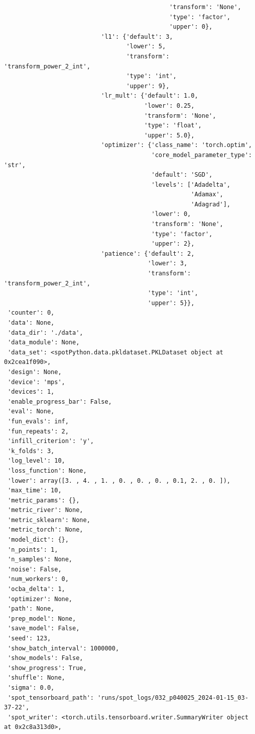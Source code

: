 \documentclass[
  letterpaper,
  DIV=11,
  numbers=noendperiod]{scrreprt}
\begin{document}
\begin{verbatim}
                                              'transform': 'None',
                                              'type': 'factor',
                                              'upper': 0},
                           'l1': {'default': 3,
                                  'lower': 5,
                                  'transform': 'transform_power_2_int',
                                  'type': 'int',
                                  'upper': 9},
                           'lr_mult': {'default': 1.0,
                                       'lower': 0.25,
                                       'transform': 'None',
                                       'type': 'float',
                                       'upper': 5.0},
                           'optimizer': {'class_name': 'torch.optim',
                                         'core_model_parameter_type': 'str',
                                         'default': 'SGD',
                                         'levels': ['Adadelta',
                                                    'Adamax',
                                                    'Adagrad'],
                                         'lower': 0,
                                         'transform': 'None',
                                         'type': 'factor',
                                         'upper': 2},
                           'patience': {'default': 2,
                                        'lower': 3,
                                        'transform': 'transform_power_2_int',
                                        'type': 'int',
                                        'upper': 5}},
 'counter': 0,
 'data': None,
 'data_dir': './data',
 'data_module': None,
 'data_set': <spotPython.data.pkldataset.PKLDataset object at 0x2cea1f090>,
 'design': None,
 'device': 'mps',
 'devices': 1,
 'enable_progress_bar': False,
 'eval': None,
 'fun_evals': inf,
 'fun_repeats': 2,
 'infill_criterion': 'y',
 'k_folds': 3,
 'log_level': 10,
 'loss_function': None,
 'lower': array([3. , 4. , 1. , 0. , 0. , 0. , 0.1, 2. , 0. ]),
 'max_time': 10,
 'metric_params': {},
 'metric_river': None,
 'metric_sklearn': None,
 'metric_torch': None,
 'model_dict': {},
 'n_points': 1,
 'n_samples': None,
 'noise': False,
 'num_workers': 0,
 'ocba_delta': 1,
 'optimizer': None,
 'path': None,
 'prep_model': None,
 'save_model': False,
 'seed': 123,
 'show_batch_interval': 1000000,
 'show_models': False,
 'show_progress': True,
 'shuffle': None,
 'sigma': 0.0,
 'spot_tensorboard_path': 'runs/spot_logs/032_p040025_2024-01-15_03-37-22',
 'spot_writer': <torch.utils.tensorboard.writer.SummaryWriter object at 0x2c8a313d0>,

\end{verbatim}
\end{document}
